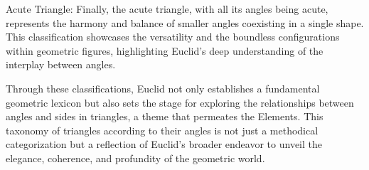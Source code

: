 Acute Triangle: Finally, the acute triangle, with all its angles being acute, represents the harmony and balance of smaller angles coexisting in a single shape. This classification showcases the versatility and the boundless configurations within geometric figures, highlighting Euclid's deep understanding of the interplay between angles.

\begin{figure}[H]
\centering
{}
\end{figure}

Through these classifications, Euclid not only establishes a fundamental geometric lexicon but also sets the stage for exploring the relationships between angles and sides in triangles, a theme that permeates the Elements. This taxonomy of triangles according to their angles is not just a methodical categorization but a reflection of Euclid's broader endeavor to unveil the elegance, coherence, and profundity of the geometric world.


\clearpage
